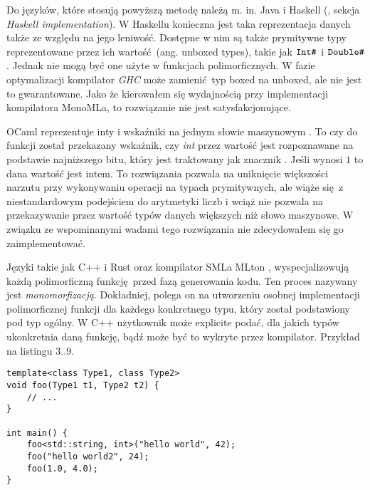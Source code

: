 \documentclass[declaration,shortabstract]{iithesis}
\begin{document}
Do języków, które stosują powyższą metodę należą m. in. Java 
\cite{type_erasure} i Haskell 
(\cite{haskell_poly}, sekcja \textit{Haskell implementation}).
W Haskellu konieczna jest taka reprezentacja danych także ze względu na jego 
leniwość. Dostępne w nim są także prymitywne typy reprezentowane przez 
ich wartość (ang. unboxed types), takie jak $\verb!Int#!$ i 
$\verb!Double#!$. Jednak nie mogą być one użyte w funkcjach polimorficznych. 
W fazie optymalizacji kompilator \textit{GHC} może zamienić typ boxed 
na unboxed, ale nie jest to gwarantowane. Jako że kierowałem się wydajnością
przy implementacji kompilatora MonoMLa, to rozwiązanie nie jest 
satysfakcjonujące.

OCaml reprezentuje inty i wskaźniki na jednym słowie 
maszynowym \cite{levity_polymorphism}. 
To czy do funkcji został przekazany wskaźnik, czy \textit{int}
przez wartość jest rozpoznawane na podstawie najniższego bitu, który jest 
traktowany jak znacznik \cite{ocaml_31bit}. Jeśli wynosi $1$ to dana wartość jest intem.
To rozwiązania pozwala na uniknięcie większości narzutu przy wykonywaniu 
operacji na typach prymitywnych, ale wiąże się z niestandardowym podejściem do 
arytmetyki liczb i wciąż nie pozwala na przekazywanie przez wartość typów danych 
większych niż słowo maszynowe. W związku ze wspominanymi wadami tego 
rozwiązania nie zdecydowałem się go zaimplementować.

Języki takie jak C++ i Rust \cite{levity_polymorphism} oraz kompilator SMLa 
MLton \cite{mono_mlton}, wyspecjalizowują każdą polimorficzną funkcję przed 
fazą generowania 
kodu. Ten proces nazywany jest \textit{monomorfizacją}. Dokładniej, polega on na 
utworzeniu osobnej 
implementacji polimorficznej funkcji dla każdego konkretnego typu, który 
został 
podstawiony pod typ ogólny. W C++ użytkownik może explicite podać,
dla jakich typów ukonkretnia daną funkcję, bądź może być to wykryte przez 
kompilator. Przykład na listingu $3..9$.

\begin{lstlisting}[frame=single, caption={Polimorficzna funkcja w 
C++ z użyciem szablonów (ang. template).}]
template<class Type1, class Type2>
void foo(Type1 t1, Type2 t2) {
    // ...
}

int main() {
    foo<std::string, int>("hello world", 42);
    foo("hello world2", 24);
    foo(1.0, 4.0);
}
\end{lstlisting}
\end{document}
